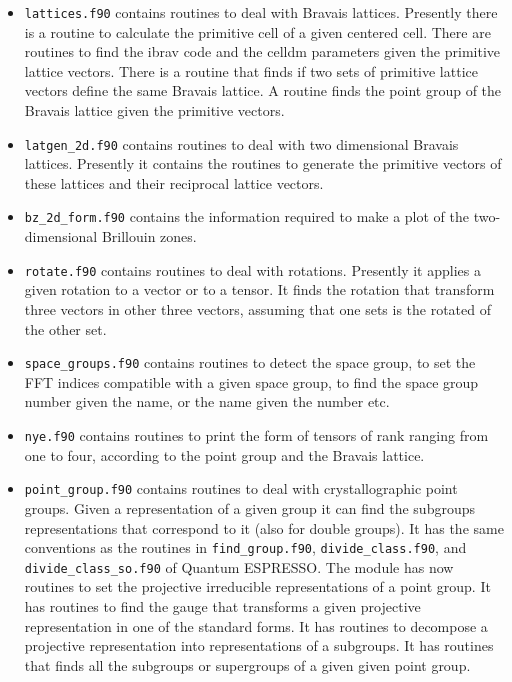 \documentclass[12pt,a4paper]{article}
\def\qe{{\sc Quantum ESPRESSO}}
\begin{document}
\begin{itemize}

\item \texttt{lattices.f90} contains routines to deal with Bravais lattices.
Presently there is a routine to calculate the primitive cell of
a given centered cell. There are routines to find the ibrav code and the
celldm parameters given the primitive lattice vectors. There is a routine
that finds if two sets of primitive lattice vectors define the same 
Bravais lattice. A routine finds the point group of the Bravais lattice
given the primitive vectors.

\item
\texttt{latgen\_2d.f90} contains routines to deal with two dimensional
Bravais lattices. Presently it contains the routines to generate the
primitive vectors of these lattices and their reciprocal lattice vectors.

\item
\texttt{bz\_2d\_form.f90} contains the information required to make a
plot of the two-dimensional Brillouin zones.

\item
\texttt{rotate.f90} contains routines to deal with rotations. Presently it
applies a given rotation to a vector or to a tensor.
It finds the rotation that transform three vectors in other three vectors,
assuming that one sets is the rotated of the other set.

\item
\texttt{space\_groups.f90} contains routines to detect the space group,
to set the FFT indices compatible with a given space group, to find the
space group number given the name, or the name given the number etc.

\item
\texttt{nye.f90} contains routines to print the form of tensors of
rank ranging from one to four, according to the point group and the
Bravais lattice.


\item
\texttt{point\_group.f90} contains routines to deal with crystallographic
point groups. Given a representation of a given group it can find 
the subgroups representations that correspond to it (also for
double groups). It has the same conventions as the routines 
in \texttt{find\_group.f90}, \texttt{divide\_class.f90}, and 
\texttt{divide\_class\_so.f90} of \qe. The module has now routines to
set the projective irreducible representations of a point group.
It has routines to find the gauge that transforms a given projective
representation in one of the standard forms. It has routines to decompose
a projective representation into representations of a subgroups.
It has routines that finds all the subgroups or supergroups of a given given
point group.


\end{itemize}
\end{document}

